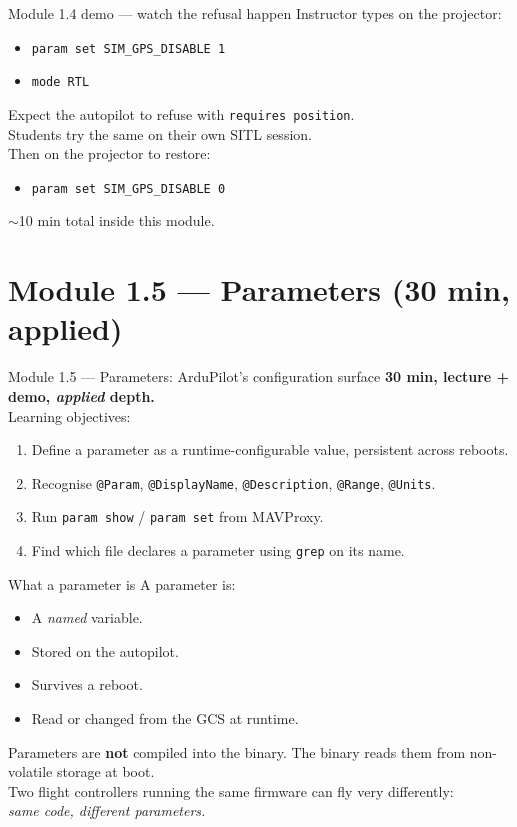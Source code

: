 \documentclass[aspectratio=169,11pt]{beamer}
\begin{document}
\begin{frame}{Module 1.4 demo --- watch the refusal happen}
  Instructor types on the projector:
  \begin{itemize}
    \item \texttt{param set SIM\_GPS\_DISABLE 1}
    \item \texttt{mode RTL}
  \end{itemize}
  Expect the autopilot to refuse with \texttt{requires position}.\\[1ex]
  Students try the same on their own SITL session.\\[1ex]
  Then on the projector to restore:
  \begin{itemize}
    \item \texttt{param set SIM\_GPS\_DISABLE 0}
  \end{itemize}
  $\sim$10 min total inside this module.
\end{frame}

\section{Module 1.5 --- Parameters (30 min, applied)}

\begin{frame}{Module 1.5 --- Parameters: ArduPilot's configuration surface}
  \textbf{30 min, lecture + demo, \emph{applied} depth.}\\[1ex]
  Learning objectives:
  \begin{enumerate}
    \item Define a parameter as a runtime-configurable value, persistent across reboots.
    \item Recognise \texttt{@Param}, \texttt{@DisplayName}, \texttt{@Description}, \texttt{@Range}, \texttt{@Units}.
    \item Run \texttt{param show} / \texttt{param set} from MAVProxy.
    \item Find which file declares a parameter using \texttt{grep} on its name.
  \end{enumerate}
\end{frame}

\begin{frame}{What a parameter is}
  A parameter is:
  \begin{itemize}
    \item A \emph{named} variable.
    \item Stored on the autopilot.
    \item Survives a reboot.
    \item Read or changed from the GCS at runtime.
  \end{itemize}
  Parameters are \textbf{not} compiled into the binary. The binary reads them from non-volatile storage at boot.\\[1ex]
  Two flight controllers running the same firmware can fly very differently:\\
  \emph{same code, different parameters.}
\end{frame}
\end{document}
